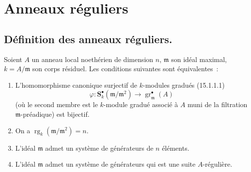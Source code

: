\section{Anneaux réguliers}
\label{section:0.17-fr}

\subsection{Définition des anneaux réguliers.}
\label{subsection:0.17.1-fr}

\begin{proposition}[17.1.1]
\label{0.17.1.1-fr}
Soient $A$ un anneau local noethérien de dimension $n$, $\mathfrak{m}$ son
idéal maximal, $k=A/\mathfrak{m}$ son corps résiduel. Les conditions suivantes
sont équivalentes~:
\begin{enumerate}
  \item[\rm a)] L'homomorphisme canonique surjectif de $k$-modules gradués
  \textup{(15.1.1.1)}
  \[
    \varphi:\mathbf{S}^\bullet_k(\mathfrak{m}/\mathfrak{m}^2)
    \longrightarrow\operatorname{gr}^\bullet_{\mathfrak{m}}(A)
  \]
  (où le second membre est le $k$-module gradué associé à $A$ muni de la
  filtration $\mathfrak{m}$-préadique) est bijectif.
  \item[\rm b)] On a
  $\operatorname{rg}_k(\mathfrak{m}/\mathfrak{m}^2)=n$.
  \item[\rm c)] L'idéal $\mathfrak{m}$ admet un système de générateurs de $n$
  éléments.
  \item[\rm d)] L'idéal $\mathfrak{m}$ admet un système de générateurs qui est
  une suite $A$-régulière.
\end{enumerate}
\end{proposition}



